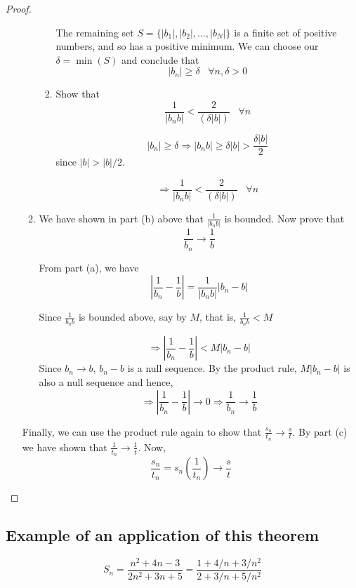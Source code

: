 \documentclass[12pt]{scrbook}
\begin{document}
\begin{proof}
\begin{enumerate}
\begin{enumerate}
\begin{enumerate}
The remaining set $S = \{ |b_1|,  |b_2|,  \ldots, |b_N| \}$ is a finite set of positive numbers, and so has a positive minimum. 
We can choose our $\delta = \min(S)$ and conclude that
\[ |b_n| \ge \delta \;\;\; \forall n, \delta > 0 \]

\item Show that 
\[ \frac{1}{|b_n b|} < \frac{2}{(\delta |b|)} \;\;\; \forall n \]

\[ |b_n| \ge \delta \Rightarrow |b_n b| \ge \delta |b| > \frac{\delta |b|}{2} \]
since $|b| > |b|/2$.

\[ \Rightarrow \frac{1}{|b_n b|} < \frac{2}{(\delta |b|)} \;\;\; \forall n \]

\end{enumerate}

\item We have shown in part (b) above that $\frac{1}{|b_n b|}$ is bounded.  Now prove that 
\[ \frac{1}{b_n}\rightarrow \frac{1}{b} \]

From part (a), we have
\[\left| \frac{1}{b_n} - \frac{1}{b} \right| = \frac{1}{|b_n b|} \left| b_n - b \right| \]

Since $\frac{1}{b_n b}$ is bounded above, say by $M$, that is, $\frac{1}{b_n b} < M$

\[\Rightarrow \left| \frac{1}{b_n} -\frac{1}{b} \right| < M | b_n - b | \]
Since $b_n \rightarrow b$, $b_n - b$ is a null sequence.  By the product rule, $M|b_n - b|$ is also a null sequence and hence,
\[ \Rightarrow \left| \frac{1}{b_n} - \frac{1}{b} \right| \rightarrow 0 \Rightarrow  \frac{1}{b_n}\rightarrow \frac{1}{b} \]

\end{enumerate}

Finally, we can use the product rule again to show that $\frac{s_n}{t_n} \rightarrow \frac{s}{t} $.  By part (c) we have shown that 
$\frac{1}{t_n} \rightarrow \frac{1}{t}$.  Now,
\[ \frac{s_n}{t_n}  = s_n \left( \frac{1}{t_n} \right) \rightarrow \frac{s}{t} \] 

\end{enumerate}
\end{proof}

\subsection{Example of an application of this theorem}

\[ S_n = \frac{n^2 + 4n - 3}{2n^2 + 3n + 5} = \frac{1 + 4/n + 3/n^2}{2 + 3/n + 5/n^2} \]
\end{document}
